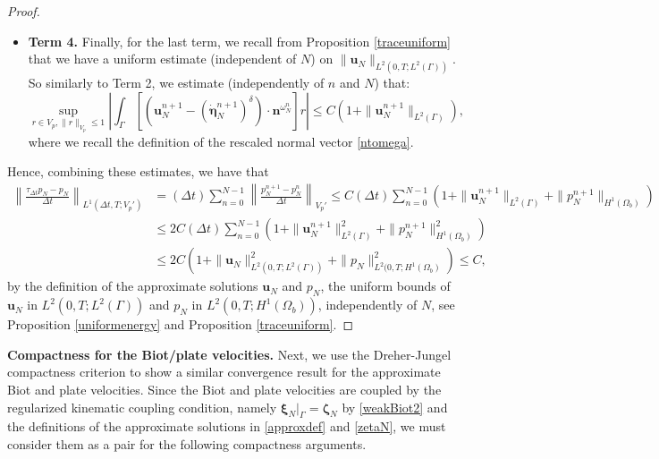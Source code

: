 \documentclass[11pt]{article}
\newcommand{\bd}{\boldsymbol}
\theoremstyle{definition}
\begin{document}
\begin{proof}
\begin{itemize}
\begin{equation*}
\sup_{r \in V_{p}, \|r\|_{V_{p}} \le 1} \left|\kappa \int_{\Omega_{b}} \mathcal{J}^{(\eta^{n}_{N})^{\delta}}_{b} \nabla^{(\eta^{n}_{N})^{\delta}}_{b} p^{n + 1}_{N} \cdot \nabla^{(\eta^{n}_{N})^{\delta}}_{b} r\right| \le C\|p^{n + 1}_{N}\|_{H^{1}(\Omega_{b})}, \ \ \text{independently of $n$ and $N$}.
\end{equation*}
\item \textbf{Term 4.} Finally, for the last term, we recall from Proposition \ref{traceuniform} that we have a uniform estimate (independent of $N$) on $\|\bd{u}_{N}\|_{L^{2}(0, T; L^{2}(\Gamma))}$. So similarly to Term 2, we estimate (independently of $n$ and $N$) that:
\begin{equation*}
\sup_{r \in V_{p}, \|r\|_{V_{p}} \le 1} \left|\int_{\Gamma} \left[\left(\bd{u}^{n + 1}_{N} - (\dot{\bd{\eta}}^{n + 1}_{N})^{\delta}\right) \cdot \bd{n}^{\omega^{n}_{N}}\right] r\right| \le C\left(1 + \|\bd{u}^{n + 1}_{N}\|_{L^{2}(\Gamma)}\right),
\end{equation*}
where we recall the definition of the rescaled normal vector \eqref{ntomega}. 
\end{itemize}
Hence, combining these estimates, we have that
\begin{align*}
\left\|\frac{\tau_{\Delta t} p_{N} - p_{N}}{\Delta t}\right\|_{L^{1}(\Delta t, T; V_{p}')} &= (\Delta t) \sum_{n = 0}^{N - 1} \left\|\frac{p^{n + 1}_{N} - p^{n}_{N}}{\Delta t}\right\|_{V_{p}'} \le C(\Delta t) \sum_{n = 0}^{N - 1} \left(1 + \|\bd{u}^{n + 1}_{N}\|_{L^{2}(\Gamma)} + \|p^{n + 1}_{N}\|_{H^{1}(\Omega_{b})} \right) \\
&\le 2C(\Delta t) \sum_{n = 0}^{N - 1} \left(1 + \|\bd{u}^{n + 1}_{N}\|^{2}_{L^{2}(\Gamma)} + \|p^{n + 1}_{N}\|^{2}_{H^{1}(\Omega_{b})}\right) \\
&\le 2C\left(1 + \|\bd{u}_{N}\|^{2}_{L^{2}(0, T; L^{2}(\Gamma))} + \|p_{N}\|_{L^{2}(0, T; H^{1}(\Omega_{b})}^{2}\right) \le C,
\end{align*}
by the definition of the approximate solutions $\bd{u}_{N}$ and $p_{N}$, the uniform bounds of $\bd{u}_{N}$ in $L^{2}(0, T; L^{2}(\Gamma))$ and $p_{N}$ in $L^{2}(0, T; H^{1}(\Omega_{b}))$, independently of $N$, see Proposition \ref{uniformenergy} and Proposition \ref{traceuniform}.
\end{proof}

\medskip

\noindent \textbf{Compactness for the Biot/plate velocities.} Next, we use the Dreher-Jungel compactness criterion to show a similar convergence result for the approximate Biot and plate velocities. Since the Biot and plate velocities are coupled by the regularized kinematic coupling condition, namely $\bd{\xi}_{N}|_{\Gamma} = \bd{\zeta}_{N}$ by \eqref{weakBiot2} and the definitions of the approximate solutions in \eqref{approxdef} and \eqref{zetaN}, we must consider them as a pair for the following compactness arguments.
\end{document}
